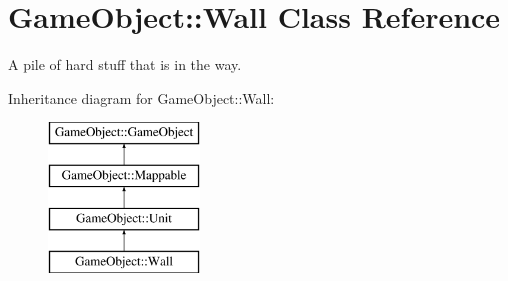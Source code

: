 \hypertarget{classGameObject_1_1Wall}{
\section{GameObject::Wall Class Reference}
\label{classGameObject_1_1Wall}
}


A pile of hard stuff that is in the way.  


Inheritance diagram for GameObject::Wall:\begin{figure}[H]
\begin{center}
\leavevmode
\includegraphics[height=4cm]{classGameObject_1_1Wall}
\end{center}
\end{figure}
